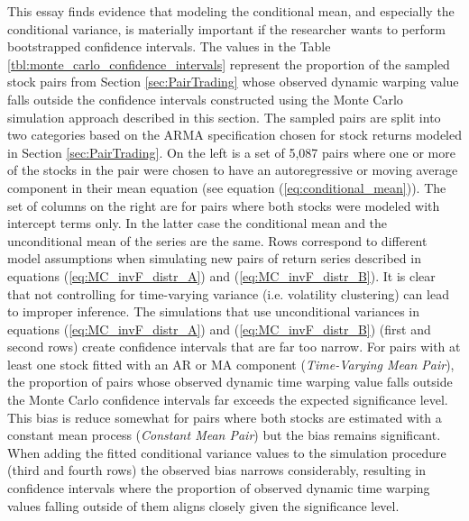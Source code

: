 This essay finds evidence that modeling the conditional mean, and especially the conditional variance, is materially important if the researcher wants to perform bootstrapped confidence intervals. The values in the Table \ref{tbl:monte_carlo_confidence_intervals} represent the proportion of the sampled stock pairs from Section \ref{sec:PairTrading} whose observed dynamic warping value falls outside the confidence intervals constructed using the Monte Carlo simulation approach described in this section. The sampled pairs are split into two categories based on the ARMA specification chosen for stock returns modeled in Section \ref{sec:PairTrading}. On the left is a set of 5,087 pairs where one or more of the stocks in the pair were chosen to have an autoregressive or moving average component in their mean equation (see equation (\ref{eq:conditional_mean})). The set of columns on the right are for pairs where both stocks were modeled with intercept terms only. In the latter case the conditional mean and the unconditional mean of the series are the same. Rows correspond to different model assumptions when simulating new pairs of return series described in equations (\ref{eq:MC_invF_distr_A}) and (\ref{eq:MC_invF_distr_B}). It is clear that not controlling for time-varying variance (i.e. volatility clustering) can lead to improper inference. The simulations that use unconditional variances in equations (\ref{eq:MC_invF_distr_A}) and (\ref{eq:MC_invF_distr_B}) (first and second rows) create confidence intervals that are far too narrow. For pairs with at least one stock fitted with an AR or MA component (\textit{Time-Varying Mean Pair}), the proportion of pairs whose observed dynamic time warping value falls outside the Monte Carlo confidence intervals far exceeds the expected significance level. This bias is reduce somewhat for pairs where both stocks are estimated with a constant mean process (\textit{Constant Mean Pair}) but the bias remains significant. When adding the fitted conditional variance values to the simulation procedure (third and fourth rows) the observed bias narrows considerably, resulting in confidence intervals where the proportion of observed dynamic time warping values falling outside of them aligns closely given the significance level. 


